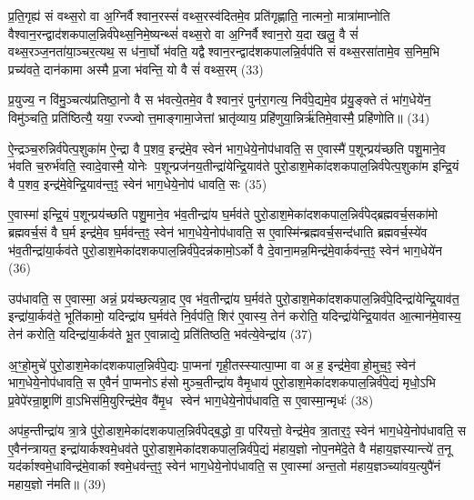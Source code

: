 प्र॒ति॒गृह्य॑ सं वथ्स॒रो वा अ॒ग्निर्वैश्वान॒रस्सं॑ वथ्स॒रस्व॑दितमे॒व प्रति॑गृह्णाति॒ नात्मनो॒ मात्रा॑माप्नोति वैश्वान॒रन्द्वाद॑शकपाल॒न्निर्व॑पेथ्स॒निमे॒ष्यन्थ्सं॑ वथ्स॒रो वा अ॒ग्निर्वैश्वान॒रो य॒दा खलु॒ वै सं॑ वथ्स॒रञ्ज॒नता॑या॒ञ्चर॒त्यथ॒ स ध॑ना॒र्घो भ॑वति॒ यद्वैश्वान॒रन्द्वाद॑शकपालन्नि॒र्वप॑ति सं वथ्स॒रसा॑तामे॒व स॒निम॒भि प्रच्य॑वते॒ दान॑कामा अस्मै प्र॒जा भ॑वन्ति॒ यो वै सं॑ वथ्स॒रम् (33)

प्र॒युज्य॒ न वि॑मु॒ञ्चत्य॑प्रतिष्ठा॒नो वै स भ॑वत्ये॒तमे॒व वैश्वान॒रं पुन॑रा॒गत्य॒ निर्व॑पे॒द्यमे॒व प्र॑यु॒ङ्क्ते तं भा॑ग॒धेये॑न॒ विमु॑ञ्चति॒ प्रति॑ष्ठित्यै॒ यया॒ रज्ज्वोत्त॒माङ्गामा॒जेत्तां भ्रातृ॑व्याय॒ प्रहि॑णुया॒न्निर्\mbox{}ऋ॑तिमे॒वास्मै॒ प्रहि॑णोति॥ (34)

{\anuvakamend{नि॒र्व॒रु॒णं व॑पेदुभ॒याद॒द्यो वै सं॑ वथ्स॒र षट्त्रिꣳ॑शच्च।\scriptsize  (6)]}}

ऐ॒न्द्रञ्च॒रुन्निर्व॑पेत्प॒शुका॑म ऐ॒न्द्रा वै प॒शव॒ इन्द्र॑मे॒व स्वेन॑ भाग॒धेये॒नोप॑धावति॒ स ए॒वास्मै॑ प॒शून्प्रय॑च्छति पशु॒माने॒व भ॑वति च॒रुर्भ॑वति॒ स्वादे॒वास्मै॒ योनेः प॒शून्प्रज॑नय॒तीन्द्रा॑येन्द्रि॒याव॑ते पुरो॒डाश॒मेका॑दशकपाल॒न्निर्व॑पेत्प॒शुका॑म इन्द्रि॒यं वै प॒शव॒ इन्द्र॑मे॒वेन्द्रि॒याव॑न्त॒ꣵ॒ स्वेन॑ भाग॒धेये॒नोप॑ धावति॒ सः (35)

ए॒वास्मा॑ इन्द्रि॒यं प॒शून्प्रय॑च्छति पशु॒माने॒व भ॑व॒तीन्द्रा॑य घ॒र्मव॑ते पुरो॒डाश॒मेका॑दशकपाल॒न्निर्व॑पेद्ब्रह्मवर्च॒सका॑मो ब्रह्मवर्च॒सं वै घ॒र्म इन्द्र॑मे॒व घ॒र्मव॑न्त॒ꣵ॒ स्वेन॑ भाग॒धेये॒नोप॑धावति॒ स ए॒वास्मि॑न्ब्रह्मवर्च॒सन्द॑धाति ब्रह्मवर्च॒स्ये॑व भ॑व॒तीन्द्रा॑या॒र्कव॑ते पुरो॒डाश॒मेका॑दशकपाल॒न्निर्व॑पे॒दन्न॑कामो॒ऽर्को वै दे॒वाना॒मन्न॒मिन्द्र॑मे॒वार्कव॑न्त॒ꣵ॒ स्वेन॑ भाग॒धेये॑न (36)

उप॑धावति॒ स ए॒वास्मा॒ अन्नं॒ प्रय॑च्छत्यन्ना॒द ए॒व भ॑व॒तीन्द्रा॑य घ॒र्मव॑ते पुरो॒डाश॒मेका॑दशकपाल॒न्निर्व॑पे॒दिन्द्रा॑येन्द्रि॒याव॑त॒ इन्द्रा॑या॒र्कव॑ते॒ भूति॑कामो॒ यदिन्द्रा॑य घ॒र्मव॑ते नि॒र्वप॑ति॒ शिर॑ ए॒वास्य॒ तेन॑ करोति॒ यदिन्द्रा॑येन्द्रि॒याव॑त आ॒त्मान॑मे॒वास्य॒ तेन॑ करोति॒ यदिन्द्रा॑या॒र्कव॑ते भू॒त ए॒वान्नाद्ये॒ प्रति॑तिष्ठति॒ भव॑त्ये॒वेन्द्रा॑य (37)

अ॒ꣳ॒हो॒मुचे॑ पुरो॒डाश॒मेका॑दशकपाल॒न्निर्व॑पे॒द्यः पा॒प्मना॑ गृही॒तस्स्यात्पा॒प्मा वा अह॒ इन्द्र॑मे॒वाहो॒मुच॒ꣵ॒ स्वेन॑ भाग॒धेये॒नोप॑धावति॒ स ए॒वैनं॑ पा॒प्मनोऽह॑सो मुञ्च॒तीन्द्रा॑य वैमृ॒धाय॑ पुरो॒डाश॒मेका॑दशकपाल॒न्निर्व॑पे॒द्यं मृधो॒ऽभि प्र॒वेपे॑रन्रा॒ष्ट्राणि॑ वा॒ऽभिस॑मि॒युरिन्द्र॑मे॒व वै॑मृ॒ध स्वेन॑ भाग॒धेये॒नोप॑धावति॒ स ए॒वास्मा॒न्मृधः॑ (38)

अप॑ह॒न्तीन्द्रा॑य त्रा॒त्रे पु॑रो॒डाश॒मेका॑दशकपाल॒न्निर्व॑पेद्ब॒द्धो वा॒ परि॑यत्तो॒ वेन्द्र॑मे॒व त्रा॒तार॒ꣵ॒ स्वेन॑ भाग॒धेये॒नोप॑धावति॒ स ए॒वैन॑न्त्रायत॒ इन्द्रा॑यार्कश्वमे॒धव॑ते पुरो॒डाश॒मेका॑दशकपाल॒न्निर्व॑पे॒द्यं म॑हाय॒ज्ञो नोप॒नमे॑दे॒ते वै म॑हाय॒ज्ञस्यान्त्ये॑ त॒नू यद॑र्काश्वमे॒धाविन्द्र॑मे॒वार्काश्वमे॒धव॑न्त॒ꣵ॒ स्वेन॑ भाग॒धेये॒नोप॑धावति॒ स ए॒वास्मा॑ अन्त॒तो म॑हाय॒ज्ञञ्च्या॑वय॒त्युपै॑नं महाय॒ज्ञो न॑मति॥ (39)

